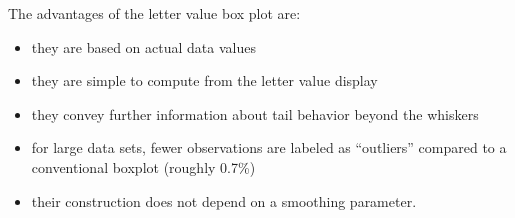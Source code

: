 \documentclass[oneside]{article}
\begin{document}
The advantages of the letter value box plot are:

\begin{itemize}
\item they are based on actual data values 
\item they are simple to compute from the letter value display
\item they convey further information about tail behavior beyond the whiskers
\item for large data sets, fewer observations are labeled as ``outliers'' 
compared to a conventional boxplot (roughly 0.7\%)
\item their construction does not depend on a smoothing parameter.
\end{itemize} 

% 
% 
% 
% 
% 



\end{document}
